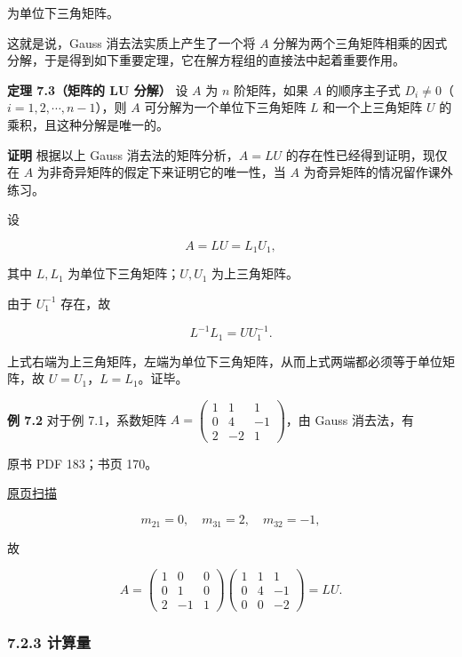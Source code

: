 \documentclass[
  10pt,
  fontset=fandol]{ctexart}
\begin{document}
为单位下三角矩阵。

这就是说，Gauss 消去法实质上产生了一个将 \(A\) 分解为两个三角矩阵相乘的因式分解，于是得到如下重要定理，它在解方程组的直接法中起着重要作用。

\textbf{定理 7.3（矩阵的 LU 分解）} 设 \(A\) 为 \(n\) 阶矩阵，如果 \(A\) 的顺序主子式 \(D_i\ne0\)（\(i=1,2,\cdots,n-1\)），则 \(A\) 可分解为一个单位下三角矩阵 \(L\) 和一个上三角矩阵 \(U\) 的乘积，且这种分解是唯一的。

\textbf{证明} 根据以上 Gauss 消去法的矩阵分析，\(A=LU\) 的存在性已经得到证明，现仅在 \(A\) 为非奇异矩阵的假定下来证明它的唯一性，当 \(A\) 为奇异矩阵的情况留作课外练习。

设

\[A=LU=L_1U_1,\]

其中 \(L,L_1\) 为单位下三角矩阵；\(U,U_1\) 为上三角矩阵。

由于 \(U_1^{-1}\) 存在，故

\[L^{-1}L_1=UU_1^{-1}.\]

上式右端为上三角矩阵，左端为单位下三角矩阵，从而上式两端都必须等于单位矩阵，故 \(U=U_1\)，\(L=L_1\)。证毕。

\textbf{例 7.2} 对于例 7.1，系数矩阵 \(A=\begin{pmatrix}1&1&1\\0&4&-1\\2&-2&1\end{pmatrix}\)，由 Gauss 消去法，有

\clearpage

原书 PDF 183；书页 170。

\href{/Users/xiangjunfeng/Desktop/数值计算专用/numerical-analysis/book/source-images/pdf-183.jpeg}{原页扫描}

\[m_{21}=0,\quad m_{31}=2,\quad m_{32}=-1,\]

故

\[
A=\begin{pmatrix}1&0&0\\0&1&0\\2&-1&1\end{pmatrix}
\begin{pmatrix}1&1&1\\0&4&-1\\0&0&-2\end{pmatrix}=LU.
\]

\subsubsection{7.2.3 计算量}\label{ux8ba1ux7b97ux91cf}
\end{document}
